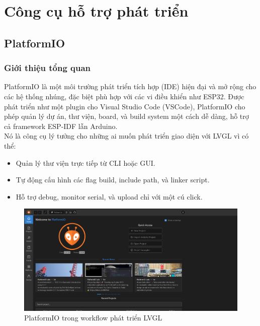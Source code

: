 \section{Công cụ hỗ trợ phát triển}
\subsection{PlatformIO}
\subsubsection{Giới thiệu tổng quan}
PlatformIO là một môi trường phát triển tích hợp (IDE) hiện đại và mở rộng cho các hệ thống nhúng, đặc biệt phù hợp với các vi điều khiển như ESP32. Được phát triển như một plugin cho Visual Studio Code (VSCode), PlatformIO cho phép quản lý dự án, thư viện, board, và build system một cách dễ dàng, hỗ trợ cả framework ESP-IDF lẫn Arduino.\\
Nó là công cụ lý tưởng cho những ai muốn phát triển giao diện với LVGL vì có thể:
\begin{itemize}
    \item Quản lý thư viện trực tiếp từ CLI hoặc GUI.
    \item Tự động cấu hình các flag build, include path, và linker script.
    \item Hỗ trợ debug, monitor serial, và upload chỉ với một cú click.
\end{itemize}
\begin{figure}[H]
  \centering
  \includegraphics[width=1\textwidth]{Images/PlatformIO.png}
  \caption{PlatformIO trong workflow phát triển LVGL}
\end{figure}
